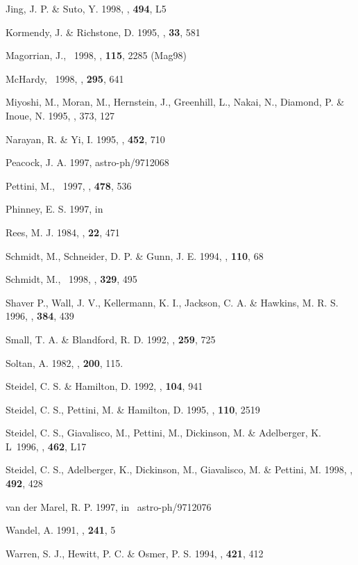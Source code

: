 {{{{{{{{{{{{{{\begin{references}
 Jing, J. P. \& Suto, Y. 1998, \apjl, {\bf 494}, L5

 Kormendy, J. \& Richstone, D. 1995, \araa, {\bf 33}, 581

 Magorrian, J., \etal\ 1998, \aj, {\bf 115}, 2285 (Mag98)

 McHardy, \etal\ 1998, \mnras, {\bf 295}, 641


 Miyoshi, M., Moran, M., Hernstein, J., Greenhill, L., Nakai, N.,
Diamond, P. \& Inoue, N. 1995, \nat, 373, 127

 Narayan, R. \& Yi, I. 1995, \apj, {\bf 452}, 710

 Peacock, J. A. 1997, astro-ph/9712068 %

 Pettini, M., \etal\ 1997, \apj, {\bf 478}, 536

 Phinney, E. S. 1997, in \SandersBarnes

 Rees, M. J. 1984, \araa, {\bf 22}, 471

 Schmidt, M., Schneider, D. P. \& Gunn, J. E. 1994, \aj, {\bf 110}, 68

 Schmidt, M., \etal\ 1998, \aap, {\bf 329}, 495

 Shaver P., Wall, J. V., Kellermann, K. I., Jackson, C. A. \& Hawkins,
M. R. S. 1996, \nat, {\bf 384}, 439

 Small, T. A. \& Blandford, R. D. 1992, \mnras, {\bf 259}, 725

 Soltan, A. 1982, \mnras, {\bf 200}, 115.

 Steidel, C. S. \& Hamilton, D. 1992, \aj, {\bf 104}, 941

 Steidel, C. S., Pettini, M. \& Hamilton, D. 1995, \aj, {\bf 110},
2519

 Steidel, C. S., Giavalisco, M., Pettini, M., Dickinson, M. \&
Adelberger, K. L\ 1996, \apj, {\bf 462}, L17

 Steidel, C. S., Adelberger, K., Dickinson, M., Giavalisco, M. \&
Pettini, M. 1998, \apj, {\bf 492}, 428

 van der Marel, R. P. 1997, in \SandersBarnes\ astro-ph/9712076

 Wandel, A. 1991, \aap, {\bf 241}, 5

 Warren, S. J., Hewitt, P. C. \& Osmer, P. S. 1994, \apj, {\bf 421},
412


\end{references}}}}}}}}}}}}}}}
